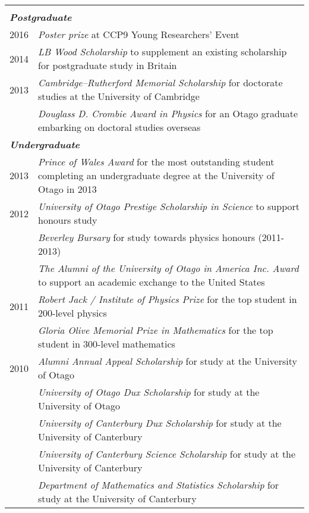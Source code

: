 \documentclass[10pt,a4paper,final]{article}
\begin{document}
\begin{table}[h!]
\sffamily
\begin{tabularx}{\textwidth}{l m{}}
\rowcolor{seaborn_blue}
\multicolumn{2}{l}{\textcolor{white}{\textbf{Scholarships, Awards, And Prizes}}} \\
\multicolumn{2}{l}{\textbf{\textit{Postgraduate}}} \\
{2016} & \textit{Poster prize} at CCP9 Young Researchers' Event \\
{2014} & \textit{LB Wood Scholarship} to supplement an existing scholarship for postgraduate study in Britain \\
{2013} & \textit{Cambridge--Rutherford Memorial Scholarship} for doctorate studies at the University of Cambridge \\
& \textit{Douglass D. Crombie Award in Physics} for an Otago graduate embarking on doctoral studies overseas \\
\multicolumn{2}{l}{\textbf{\textit{Undergraduate}}} \\
{2013} & \textit{Prince of Wales Award} for the most outstanding student completing an undergraduate degree at the University of Otago in 2013\\
{2012} & \textit{University of Otago Prestige Scholarship in Science} to support honours study\\
       & \textit{Beverley Bursary} for study towards physics honours (2011-2013)\\
       & \textit{The Alumni of the University of Otago in America Inc. Award} to support an academic exchange to the United States\\
{2011} & \textit{Robert Jack / Institute of Physics Prize} for the top student in 200-level physics\\
       & \textit{Gloria Olive Memorial Prize in Mathematics} for the top student in 300-level mathematics\\
{2010} & \textit{Alumni Annual Appeal Scholarship} for study at the University of Otago\\
       & \textit{University of Otago Dux Scholarship} for study at the University of Otago\\
       & \textit{University of Canterbury Dux Scholarship} for study at the University of Canterbury\\
       & \textit{University of Canterbury Science Scholarship} for study at the University of Canterbury\\
       & \textit{Department of Mathematics and Statistics Scholarship} for study at the University of Canterbury\\

\end{tabularx}
\end{table}
\end{document}
